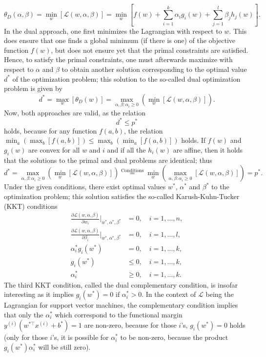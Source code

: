 \documentclass[a4paper,11pt]{article}
\numberwithin{equation}{section}
\begin{document}
{\begin{equation}
\theta_D(\alpha,\beta) = \min_{w}\left[\mathcal{L}(w,\alpha,\beta)\right] = \min_{w}\left[f(w)  + \sum_{i=1}^k \alpha_i g_i(w) + \sum_{j=1}^{l}\beta_j h_j(w)\right].
\end{equation} In the dual approach, one first minimizes the Lagrangian with respect to $w$. This does ensure that one finds a global minimum (if there is one) of the objective function $f(w)$, but does not ensure yet that the primal constraints are satisfied. Hence, to satisfy the primal constraints, one must afterwards maximize with respect to $\alpha$ and $\beta$ to obtain another solution corresponding to the optimal value $d^*$ of the optimization problem; this solution to the so-called dual optimization problem is given by \begin{equation}
d^* = \max_w\left[\theta_D(w)\right] = \max_{\alpha,\beta:\alpha_i\geq 0}\left(\min_w\left[\mathcal{L}(w,\alpha,\beta)\right]\right).
\end{equation} Now, both approaches are valid, as the relation \begin{equation}
d^* \leq p^*
\end{equation} holds, because for any function $f(a,b)$, the relation $\min_a\left(\max_b\left[f(a,b)\right]\right) \leq \max_b \left( \min_a\left[f(a,b)\right]\right)$ holds. If $f(w)$ and $g_i(w)$ are convex for all $w$ and $i$ and if all the $h_i(w)$ are affine, then it holds that the solutions to the primal and dual problems are identical; thus \begin{equation}
d^* = \max_{\alpha,\beta:\alpha_i\geq 0}\left(\min_w\left[\mathcal{L}(w,\alpha,\beta)\right]\right) \overset{\text{Conditions}}{=} \min_w\left(\max_{\alpha,\beta:\alpha_i\geq 0}\left[\mathcal{L}(w,\alpha,\beta)\right]\right) = p^*.
\end{equation} Under the given conditions, there exist optimal values $w^*$, $\alpha^*$ and $\beta^*$ to the optimization problem; this solution satisfies the so-called Karush-Kuhn-Tucker (KKT) conditions \begin{align}
\frac{\partial \mathcal{L}(w,\alpha,\beta)}{\partial w_i}\biggr|_{w^*,\alpha^*,\beta^*} &= 0, \quad i = 1,\dots,n,\\
\frac{\partial \mathcal{L}(w,\alpha,\beta)}{\partial \beta_i}\biggr|_{w^*,\alpha^*,\beta^*} &= 0, \quad i = 1,\dots,l,\\
\alpha^*_i g_i(w^*) &= 0, \quad i =1,\dots,k,\\
g_i(w^*) &\leq 0, \quad i =1,\dots,k,\\
\alpha_i^* &\geq 0, \quad i = 1,\dots,k.
\end{align} The third KKT condition, called the dual complementary condition, is insofar interesting as it implies $g_i(w^*)=0$ if $\alpha_i^* > 0$. In the context of $\mathcal{L}$ being the Lagrangian for support vector machines, the complementary condition implies that only the $\alpha_i^*$ which correspond to the functional margin $y^{(i)}\left(w^{*\top}x^{(i)}+b^*\right) =1$ are non-zero, because for those $i$'s, $g_i(w^*)=0$ holds (only for those $i$'s, it is possible for $\alpha_i^*$ to be non-zero, because the product $g_i(w^*)\alpha_i^*$ will be still zero).
}
\end{document}
